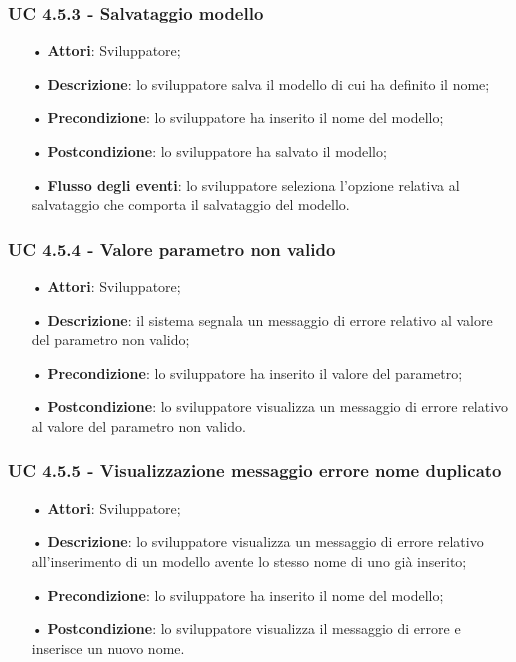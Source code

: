 \subsubsection{UC 4.5.3 - Salvataggio modello}
\begin{itemize}
\item[•]\textbf{Attori}: Sviluppatore;
\item[•]\textbf{Descrizione}: lo sviluppatore salva il modello di cui ha definito il nome;
\item[•]\textbf{Precondizione}: lo sviluppatore ha inserito il nome del modello;
\item[•]\textbf{Postcondizione}: lo sviluppatore ha salvato il modello;
\item[•]\textbf{Flusso degli eventi}: lo sviluppatore seleziona l'opzione relativa al salvataggio che comporta il salvataggio del modello.
\end{itemize}

\subsubsection{UC 4.5.4 - Valore parametro non valido}
\begin{itemize}
\item[•]\textbf{Attori}: Sviluppatore;
\item[•]\textbf{Descrizione}: il sistema segnala un messaggio di errore relativo al valore del parametro non valido;
\item[•]\textbf{Precondizione}: lo sviluppatore ha inserito il valore del parametro;
\item[•]\textbf{Postcondizione}: lo sviluppatore visualizza un messaggio di errore relativo al valore del parametro non valido.
\end{itemize}
\subsubsection{UC 4.5.5 - Visualizzazione messaggio errore nome duplicato}
\begin{itemize}
\item[•]\textbf{Attori}: Sviluppatore;
\item[•]\textbf{Descrizione}: lo sviluppatore visualizza un messaggio di errore relativo all'inserimento di un modello avente lo stesso nome di uno già inserito;
\item[•]\textbf{Precondizione}: lo sviluppatore ha inserito il nome del modello;
\item[•]\textbf{Postcondizione}: lo sviluppatore visualizza il messaggio di errore e inserisce un nuovo nome.
\end{itemize}


